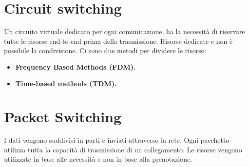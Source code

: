 \section{Circuit switching}
Un circuito virtuale dedicato per ogni comunicazione, ha la necessità di riservare tutte le risorse end-to-end prima della trasmissione. Risorse dedicate e non è possibile la condivisione.
Ci sono due metodi per dividere le risorse:
\begin{itemize}
    \item \textbf{Frequency Based Methods (FDM).}
    \item \textbf{Time-based methods (TDM).}
\end{itemize}

\section{Packet Switching}
I dati vengono suddivisi in parti e inviati attraverso la rete.
Ogni pacchetto utilizza tutta la capacità di trasmissione di un collegamento. Le risorse vengono utilizzate in base alle necessità e non in base alla prenotazione.